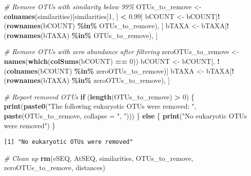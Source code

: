 \documentclass[
  11pt,
]{article}
\newenvironment{Shaded}{\begin{snugshade}}{\end{snugshade}}
\newcommand{\AttributeTok}[1]{\textcolor[rgb]{0.13,0.29,0.53}{#1}}
\newcommand{\CommentTok}[1]{\textcolor[rgb]{0.56,0.35,0.01}{\textit{#1}}}
\newcommand{\ControlFlowTok}[1]{\textcolor[rgb]{0.13,0.29,0.53}{\textbf{#1}}}
\newcommand{\DecValTok}[1]{\textcolor[rgb]{0.00,0.00,0.81}{#1}}
\newcommand{\FloatTok}[1]{\textcolor[rgb]{0.00,0.00,0.81}{#1}}
\newcommand{\FunctionTok}[1]{\textcolor[rgb]{0.13,0.29,0.53}{\textbf{#1}}}
\newcommand{\NormalTok}[1]{#1}
\newcommand{\OtherTok}[1]{\textcolor[rgb]{0.56,0.35,0.01}{#1}}
\newcommand{\SpecialCharTok}[1]{\textcolor[rgb]{0.81,0.36,0.00}{\textbf{#1}}}
\newcommand{\StringTok}[1]{\textcolor[rgb]{0.31,0.60,0.02}{#1}}
\begin{document}
\begin{Shaded}
\begin{Highlighting}[]
\CommentTok{\# Remove OTUs with similarity below 99\%}
\NormalTok{OTUs\_to\_remove }\OtherTok{\textless{}{-}} \FunctionTok{colnames}\NormalTok{(similarities)[similarities[}\DecValTok{1}\NormalTok{, ] }\SpecialCharTok{\textless{}} \FloatTok{0.99}\NormalTok{]}
\NormalTok{bCOUNT }\OtherTok{\textless{}{-}}\NormalTok{ bCOUNT[}\SpecialCharTok{!}\NormalTok{(}\FunctionTok{rownames}\NormalTok{(bCOUNT) }\SpecialCharTok{\%in\%}\NormalTok{ OTUs\_to\_remove), ]}
\NormalTok{bTAXA }\OtherTok{\textless{}{-}}\NormalTok{ bTAXA[}\SpecialCharTok{!}\NormalTok{(}\FunctionTok{rownames}\NormalTok{(bTAXA) }\SpecialCharTok{\%in\%}\NormalTok{ OTUs\_to\_remove), ]}

\CommentTok{\# Remove OTUs with zero abundance after filtering}
\NormalTok{zeroOTUs\_to\_remove }\OtherTok{\textless{}{-}} \FunctionTok{names}\NormalTok{(}\FunctionTok{which}\NormalTok{(}\FunctionTok{colSums}\NormalTok{(bCOUNT) }\SpecialCharTok{==} \DecValTok{0}\NormalTok{))}
\NormalTok{bCOUNT }\OtherTok{\textless{}{-}}\NormalTok{ bCOUNT[, }\SpecialCharTok{!}\NormalTok{(}\FunctionTok{colnames}\NormalTok{(bCOUNT) }\SpecialCharTok{\%in\%}\NormalTok{ zeroOTUs\_to\_remove)]}
\NormalTok{bTAXA }\OtherTok{\textless{}{-}}\NormalTok{ bTAXA[}\SpecialCharTok{!}\NormalTok{(}\FunctionTok{rownames}\NormalTok{(bTAXA) }\SpecialCharTok{\%in\%}\NormalTok{ zeroOTUs\_to\_remove), ]}

\CommentTok{\# Report removed OTUs}
\ControlFlowTok{if}\NormalTok{ (}\FunctionTok{length}\NormalTok{(OTUs\_to\_remove) }\SpecialCharTok{\textgreater{}} \DecValTok{0}\NormalTok{) \{}
  \FunctionTok{print}\NormalTok{(}\FunctionTok{paste0}\NormalTok{(}\StringTok{"The following eukaryotic OTUs were removed: "}\NormalTok{, }\FunctionTok{paste}\NormalTok{(OTUs\_to\_remove, }\AttributeTok{collapse =} \StringTok{", "}\NormalTok{)))}
\NormalTok{\} }\ControlFlowTok{else}\NormalTok{ \{}
  \FunctionTok{print}\NormalTok{(}\StringTok{"No eukaryotic OTUs were removed"}\NormalTok{)}
\NormalTok{\}}
\end{Highlighting}
\end{Shaded}

\begin{verbatim}
[1] "No eukaryotic OTUs were removed"
\end{verbatim}

\begin{Shaded}
\begin{Highlighting}[]
\CommentTok{\# Clean up}
\FunctionTok{rm}\NormalTok{(eSEQ, AtSEQ, similarities, OTUs\_to\_remove, zeroOTUs\_to\_remove, distances)}
\end{Highlighting}
\end{Shaded}
\end{document}
